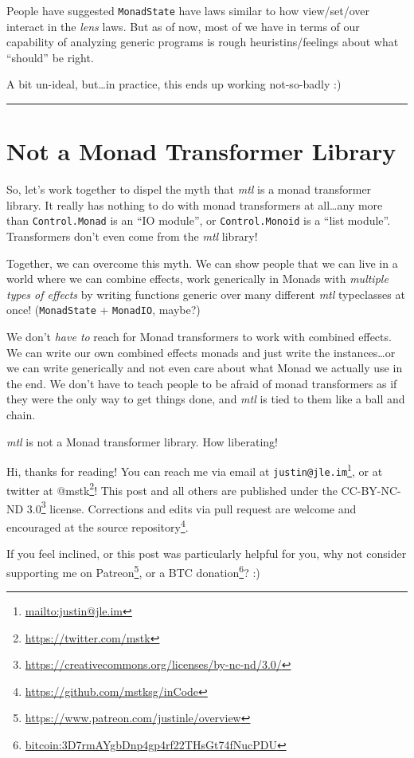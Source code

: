 \documentclass[]{article}
\renewcommand{\href}[2]{#2\footnote{\url{#1}}}
\begin{document}
People have suggested \texttt{MonadState} have laws similar to how view/set/over
interact in the \emph{lens} laws. But as of now, most of we have in terms of our
capability of analyzing generic programs is rough heuristins/feelings about what
``should'' be right.

A bit un-ideal, but\ldots{}in practice, this ends up working not-so-badly :)

\begin{center}\rule{0.5\linewidth}{\linethickness}\end{center}

\hypertarget{not-a-monad-transformer-library}{%
\section{Not a Monad Transformer
Library}\label{not-a-monad-transformer-library}}

So, let's work together to dispel the myth that \emph{mtl} is a monad
transformer library. It really has nothing to do with monad transformers at
all\ldots{}any more than \texttt{Control.Monad} is an ``IO module'', or
\texttt{Control.Monoid} is a ``list module''. Transformers don't even come from
the \emph{mtl} library!

Together, we can overcome this myth. We can show people that we can live in a
world where we can combine effects, work generically in Monads with
\emph{multiple types of effects} by writing functions generic over many
different \emph{mtl} typeclasses at once! (\texttt{MonadState} +
\texttt{MonadIO}, maybe?)

We don't \emph{have to} reach for Monad transformers to work with combined
effects. We can write our own combined effects monads and just write the
instances\ldots{}or we can write generically and not even care about what Monad
we actually use in the end. We don't have to teach people to be afraid of monad
transformers as if they were the only way to get things done, and \emph{mtl} is
tied to them like a ball and chain.

\emph{mtl} is not a Monad transformer library. How liberating!

Hi, thanks for reading! You can reach me via email at
\href{mailto:justin@jle.im}{\nolinkurl{justin@jle.im}}, or at twitter at
\href{https://twitter.com/mstk}{@mstk}! This post and all others are published
under the \href{https://creativecommons.org/licenses/by-nc-nd/3.0/}{CC-BY-NC-ND
3.0} license. Corrections and edits via pull request are welcome and encouraged
at \href{https://github.com/mstksg/inCode}{the source repository}.

If you feel inclined, or this post was particularly helpful for you, why not
consider \href{https://www.patreon.com/justinle/overview}{supporting me on
Patreon}, or a \href{bitcoin:3D7rmAYgbDnp4gp4rf22THsGt74fNucPDU}{BTC donation}?
:)
\end{document}
